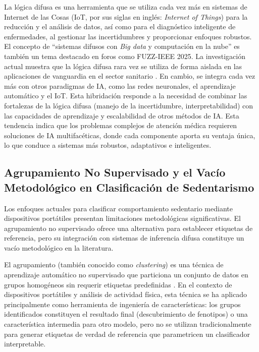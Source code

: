 La lógica difusa es una herramienta que se utiliza cada vez más en sistemas de Internet de las Cosas (IoT, por sus siglas en inglés: \textit{Internet of Things}) para la reducción y el análisis de datos, así como para el diagnóstico inteligente de enfermedades, al gestionar las incertidumbres y proporcionar enfoques robustos. El concepto de ``sistemas difusos con \textit{Big data} y computación en la nube'' es también un tema destacado en foros como FUZZ-IEEE 2025. La investigación actual muestra que la lógica difusa rara vez se utiliza de forma aislada en las aplicaciones de vanguardia en el sector sanitario \cite{Alam2022Disease}. En cambio, se integra cada vez más con otros paradigmas de IA, como las redes neuronales, el aprendizaje automático y el IoT. Esta hibridación responde a la necesidad de combinar las fortalezas de la lógica difusa (manejo de la incertidumbre, interpretabilidad) con las capacidades de aprendizaje y escalabilidad de otros métodos de IA. Esta tendencia indica que los problemas complejos de atención médica requieren soluciones de IA multifacéticas, donde cada componente aporta su ventaja única, lo que conduce a sistemas más robustos, adaptativos e inteligentes.

\subsection{Agrupamiento No Supervisado y el Vacío Metodológico en Clasificación de Sedentarismo}
\label{subsec:vacio_metodologico_agrupamiento}

Los enfoques actuales para clasificar comportamiento sedentario mediante dispositivos portátiles presentan limitaciones metodológicas significativas. El agrupamiento no supervisado ofrece una alternativa para establecer etiquetas de referencia, pero su integración con sistemas de inferencia difusa constituye un vacío metodológico en la literatura.

El agrupamiento (también conocido como \textit{clustering}) es una técnica de aprendizaje automático no supervisado que particiona un conjunto de datos en grupos homogéneos sin requerir etiquetas predefinidas \cite{Yoo2012DataMining}. En el contexto de dispositivos portátiles y análisis de actividad física, esta técnica se ha aplicado principalmente como herramienta de ingeniería de características: los grupos identificados constituyen el resultado final (descubrimiento de fenotipos) o una característica intermedia para otro modelo, pero no se utilizan tradicionalmente para generar etiquetas de verdad de referencia que parametricen un clasificador interpretable.

